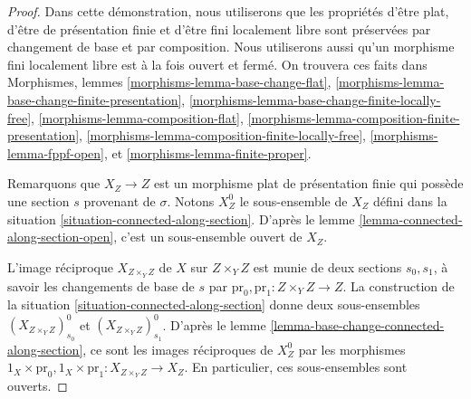 \begin{proof}
Dans cette démonstration, nous utiliserons que les propriétés d'être plat, d'être de présentation
finie et d'être fini localement libre sont préservées par changement de base et par composition.
Nous utiliserons aussi qu'un morphisme fini localement libre est à la fois ouvert et
fermé. On trouvera ces faits dans
Morphismes, lemmes
\ref{morphisms-lemma-base-change-flat},
\ref{morphisms-lemma-base-change-finite-presentation},
\ref{morphisms-lemma-base-change-finite-locally-free},
\ref{morphisms-lemma-composition-flat},
\ref{morphisms-lemma-composition-finite-presentation},
\ref{morphisms-lemma-composition-finite-locally-free},
\ref{morphisms-lemma-fppf-open}, et
\ref{morphisms-lemma-finite-proper}.

\medskip\noindent
Remarquons que $X_Z \to Z$ est un morphisme plat de présentation finie
qui possède une section $s$ provenant de $\sigma$. Notons $X_Z^0$
le sous-ensemble de $X_Z$ défini dans la
situation \ref{situation-connected-along-section}.
D'après le
lemme \ref{lemma-connected-along-section-open},
c'est un sous-ensemble ouvert de $X_Z$.

\medskip\noindent
L'image réciproque $X_{Z \times_Y Z}$ de $X$ sur $Z \times_Y Z$ est munie
de deux sections $s_0, s_1$, à savoir les changements de base de $s$ par
$\text{pr}_0, \text{pr}_1 : Z \times_Y Z \to Z$. La construction de la
situation \ref{situation-connected-along-section}
donne deux sous-ensembles $(X_{Z \times_Y Z})_{s_0}^0$ et
$(X_{Z \times_Y Z})_{s_1}^0$. D'après le
lemme \ref{lemma-base-change-connected-along-section},
ce sont les images réciproques de $X_Z^0$ par les morphismes
$1_X \times \text{pr}_0, 1_X \times \text{pr}_1 : X_{Z \times_Y Z} \to X_Z$.
En particulier, ces sous-ensembles sont ouverts.


\end{proof}
